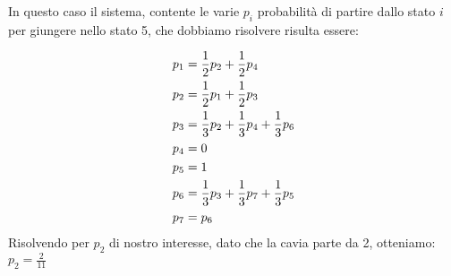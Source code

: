\documentclass{oxmathproblems}
\begin{document}
\begin{questions}
\begin{solution}
\begin{enumerate}[label=(\alph*)]
    In questo caso il sistema, contente le varie $p_i$ probabilità di partire dallo stato $i$ per giungere nello stato 5, che dobbiamo risolvere risulta essere:
    
    \begin{equation}
            \begin{split}
                p\sb{1} &=  \frac{1}{2} p\sb{2} + \frac{1}{2} p\sb{4}\\
                p\sb{2} &=   \frac{1}{2}p\sb{1} +  \frac{1}{2}p\sb{3}\\
                p\sb{3} &=  \frac{1}{3}p\sb{2} + \frac{1}{3} p\sb{4}+ \frac{1}{3} p\sb{6}\\
                p\sb{4} &= 0\\
                p\sb{5} &= 1\\
                p\sb{6} &=  \frac{1}{3}p\sb{3}  + \frac{1}{3}p\sb{7} + \frac{1}{3}p\sb{5}\\
                p\sb{7} &= p\sb{6} \\
            \end{split}
    \end{equation}
    Risolvendo per $p_2$ di nostro interesse, dato che la cavia parte da 2, otteniamo: $p_2 = \frac{2}{11}$
    \end{enumerate}
\end{solution}

\end{questions}
\end{document}
